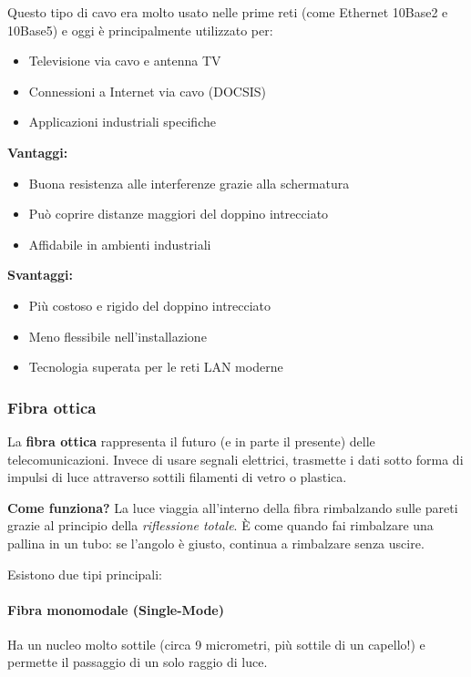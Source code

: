 \documentclass[12pt,a4paper]{article}
\begin{document}
Questo tipo di cavo era molto usato nelle prime reti (come Ethernet 10Base2 e 10Base5) e oggi è principalmente utilizzato per:
\begin{itemize}
    \item Televisione via cavo e antenna TV
    \item Connessioni a Internet via cavo (DOCSIS)
    \item Applicazioni industriali specifiche
\end{itemize}

\textbf{Vantaggi:}
\begin{itemize}
    \item Buona resistenza alle interferenze grazie alla schermatura
    \item Può coprire distanze maggiori del doppino intrecciato
    \item Affidabile in ambienti industriali
\end{itemize}

\textbf{Svantaggi:}
\begin{itemize}
    \item Più costoso e rigido del doppino intrecciato
    \item Meno flessibile nell'installazione
    \item Tecnologia superata per le reti LAN moderne
\end{itemize}

\subsubsection{Fibra ottica}

La \textbf{fibra ottica} rappresenta il futuro (e in parte il presente) delle telecomunicazioni. Invece di usare segnali elettrici, trasmette i dati sotto forma di impulsi di luce attraverso sottili filamenti di vetro o plastica.

\textbf{Come funziona?} La luce viaggia all'interno della fibra rimbalzando sulle pareti grazie al principio della \textit{riflessione totale}. È come quando fai rimbalzare una pallina in un tubo: se l'angolo è giusto, continua a rimbalzare senza uscire.

Esistono due tipi principali:

\paragraph{Fibra monomodale (Single-Mode)}
Ha un nucleo molto sottile (circa 9 micrometri, più sottile di un capello!) e permette il passaggio di un solo raggio di luce.
\end{document}
